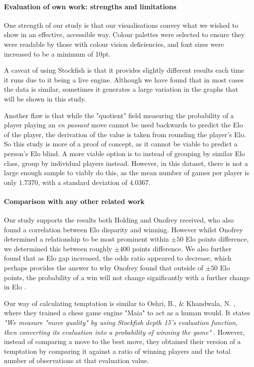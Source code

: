 \documentclass[10pt,a4paper]{article}
\begin{document}
\begin{multicols}{2}
\paragraph{Evaluation of own work: strengths and limitations}
One strength of our study is that our visualisations convey what we wished to show in an effective, accessible way. Colour palettes were selected to ensure they were readable by those with colour vision deficiencies, and font sizes were increased to be a minimum of 10pt.

A caveat of using Stockfish is that it provides slightly different results each time it runs due to it being a live engine. Although we have found that in most cases the data is similar, sometimes it generates a large variation in the graphs that will be shown in this study.\newline

Another flaw is that while the "quotient"  field measuring the probability of a player playing an \textit{en passant} move cannot be used backwards to predict the Elo of the player, the derivation of the value is taken from rounding the player's Elo. So this study is more of a proof of concept, as it cannot be viable to predict a person's Elo blind. A more viable option is to instead of grouping by similar Elo class, group by individual players instead. However, in this dataset, there is not a large enough sample to viably do this, as the mean number of games per player is only $1.7370$, with a standard deviation of $4.0367$.


\paragraph{Comparison with any other related work}
Our study supports the results both Holding \cite{PsychologyOfChessSkill} and Onofrey \cite{HowMuchDoesEloMatter} received, who also found a correlation between Elo disparity and winning. However whilst Onofrey \cite{HowMuchDoesEloMatter} determined a relationship to be most prominent within $\pm 50$ Elo points difference, we determined this between roughly $\pm 400$ points difference. We also further found that as Elo gap increased, the odds ratio appeared to decrease, which perhaps provides the answer to why Onofrey found that outside of $\pm 50$ Elo points, the
probability of a win will not change significantly with a further change in Elo \cite{HowMuchDoesEloMatter}. \newline

Our way of calculating temptation is similar to Oshri, B., \& Khandwala, N. \cite{mcilroy2020aligning}, where they trained a chess game engine "Maia" to act as a human would. It states \textit{"We measure "move quality" by using Stockfish depth 15's evaluation function, then converting its evaluation into a probability of winning the game"} \cite{mcilroy2020aligning}. However, instead of comparing a move to the best move, they obtained their version of a temptation by comparing it against a ratio of winning players and the total number of observations at that evaluation value.




\end{multicols}
\end{document}
